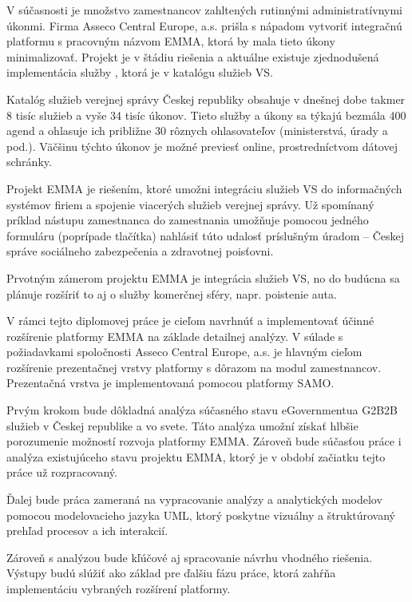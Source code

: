\startthesis
\startbodymatter

V súčasnosti je množstvo zamestnancov zahltených rutinnými administratívnymi úkonmi. Firma Asseco Central Europe, a.s. prišla s nápadom vytvoriť integračnú platformu s pracovným názvom EMMA, ktorá by mala tieto úkony minimalizovať. Projekt je v štádiu riešenia a aktuálne existuje zjednodušená implementácia služby , ktorá je v katalógu služieb VS. 

Katalóg služieb verejnej správy Českej republiky obsahuje v dnešnej dobe takmer 8 tisíc služieb a vyše 34 tisíc úkonov.  Tieto služby a úkony sa týkajú bezmála 400 agend a ohlasuje ich približne 30 rôznych ohlasovateľov (ministerstvá, úrady a pod.). Väčšinu týchto úkonov je možné previesť online, prostredníctvom dátovej schránky. 

Projekt EMMA je riešením, ktoré umožni integráciu služieb VS do informačných systémov firiem a spojenie viacerých služieb verejnej správy. Už spomínaný príklad nástupu zamestnanca do zamestnania umožňuje pomocou jedného formuláru (poprípade tlačítka) nahlásiť túto udalosť príslušným úradom -- Českej správe sociálneho zabezpečenia a zdravotnej poisťovni.

Prvotným zámerom projektu EMMA je integrácia služieb VS, no do budúcna sa plánuje rozšíriť to aj o služby komerčnej sféry, napr. poistenie auta. 

V rámci tejto diplomovej práce je cieľom navrhnúť a implementovať účinné rozšírenie platformy EMMA na základe detailnej analýzy. V súlade s požiadavkami spoločnosti Asseco Central Europe, a.s. je hlavným cieľom rozšírenie prezentačnej vrstvy platformy s dôrazom na modul zamestnancov. Prezentačná vrstva je implementovaná pomocou platformy SAMO.

Prvým krokom bude dôkladná analýza súčasného stavu eGovernmentu\zlom a G2B2B služieb v Českej republike a vo svete. Táto analýza umožní získať hlbšie porozumenie možností rozvoja platformy EMMA. Zároveň bude súčasťou práce i analýza existujúceho stavu projektu EMMA, ktorý je v období začiatku tejto práce už rozpracovaný.

Ďalej bude práca zameraná na vypracovanie analýzy a analytických modelov pomocou modelovacieho jazyka UML, ktorý poskytne vizuálny a štruktúrovaný prehľad procesov a ich interakcií. 

Zároveň s analýzou bude kľúčové aj spracovanie návrhu vhodného riešenia. Výstupy budú slúžiť ako základ pre ďalšiu fázu práce, ktorá zahŕňa implementáciu vybraných rozšírení platformy.

